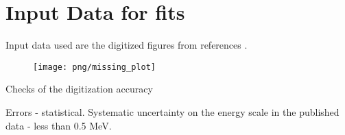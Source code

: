 \section { Input Data for fits}

Input data used are the digitized figures from references
\cite{RMC_1992_PhysRevC.46.1094,RMC_1999_PhysRevC.59.2853}.

\begin{figure}[htbp]
 \begin{center}
 \texttt{[image: png/missing\_plot]} 
 \end{center}
 \caption{}
 \label{p004}
 \end{figure}
Checks of the digitization accuracy

Errors - statistical. Systematic uncertainty on the energy scale in the
published data - less than 0.5 MeV.

